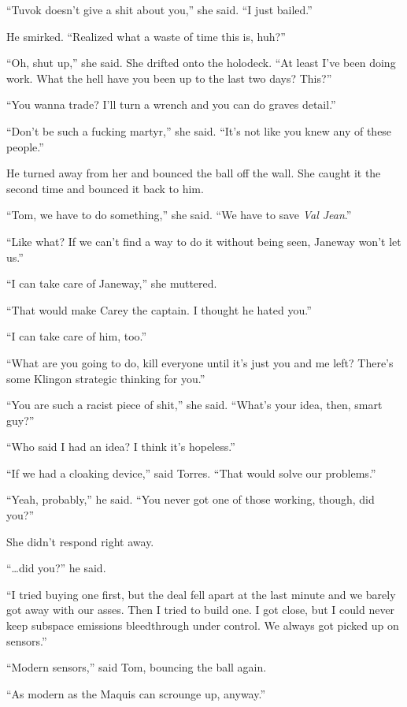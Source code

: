 \documentclass[twoside,letterpaper,12pt]{memoir}
\begin{document}
``Tuvok doesn't give a shit about you,'' she said. ``I just bailed.'' 

He smirked. ``Realized what a waste of time this is, huh?'' 

``Oh, shut up,'' she said. She drifted onto the holodeck. ``At least I've been doing work. What the hell have you been up to the last two days? This?'' 

``You wanna trade? I'll turn a wrench and you can do graves detail.'' 

``Don't be such a fucking martyr,'' she said. ``It's not like you knew any of these people.'' 

He turned away from her and bounced the ball off the wall. She caught it the second time and bounced it back to him. 

``Tom, we have to do something,'' she said. ``We have to save \textit{Val Jean}.'' 

``Like what? If we can't find a way to do it without being seen, Janeway won't let us.'' 

``I can take care of Janeway,'' she muttered. 

``That would make Carey the captain. I thought he hated you.'' 

``I can take care of him, too.'' 

``What are you going to do, kill everyone until it's just you and me left? There's some Klingon strategic thinking for you.'' 

``You are such a racist piece of shit,'' she said. ``What's your idea, then, smart guy?'' 

``Who said I had an idea? I think it's hopeless.'' 

``If we had a cloaking device,'' said Torres. ``That would solve our problems.'' 

``Yeah, probably,'' he said. ``You never got one of those working, though, did you?'' 

She didn't respond right away. 

``\ldots did you?'' he said. 

``I tried buying one first, but the deal fell apart at the last minute and we barely got away with our asses. Then I tried to build one. I got close, but I could never keep subspace emissions bleedthrough under control. We always got picked up on sensors.'' 

``Modern sensors,'' said Tom, bouncing the ball again. 

``As modern as the Maquis can scrounge up, anyway.'' 
\end{document}
